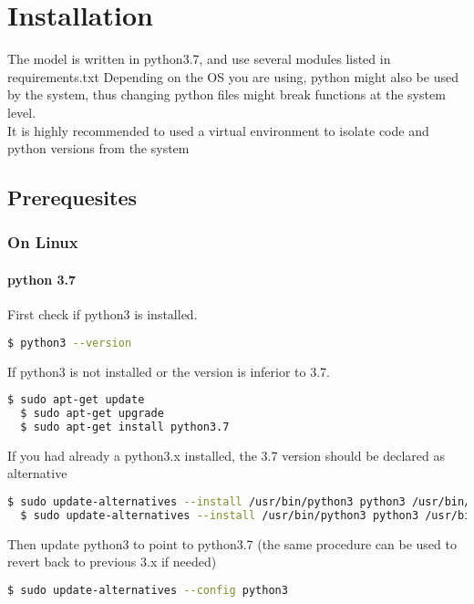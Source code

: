 \chapter{Installation}

The model is written in python3.7, and use several modules listed in requirements.txt
Depending on the OS you are using, python might also be used by the system, thus changing python files might break functions at the system level.\\

It is highly recommended to used a virtual environment to isolate code and python versions from the system

\section{Prerequesites} %
\label{sec:prerequesites}

\subsection{On Linux}
\subsubsection{python 3.7}

First check if python3 is installed.
\begin{lstlisting}[language=bash]
  $ python3 --version
\end{lstlisting}

If python3 is not installed or the version is inferior to 3.7.

\begin{lstlisting}[language=bash]
  $ sudo apt-get update
  $ sudo apt-get upgrade
  $ sudo apt-get install python3.7
\end{lstlisting}

If you had already a python3.x installed, the 3.7 version should be declared as alternative

\begin{lstlisting}[language=bash]
  $ sudo update-alternatives --install /usr/bin/python3 python3 /usr/bin/python3.x 1
  $ sudo update-alternatives --install /usr/bin/python3 python3 /usr/bin/python3.7 2
\end{lstlisting}

Then update python3 to point to python3.7 (the same procedure can be used to revert back to previous 3.x if needed)

\begin{lstlisting}[language=bash]
  $ sudo update-alternatives --config python3
\end{lstlisting}

